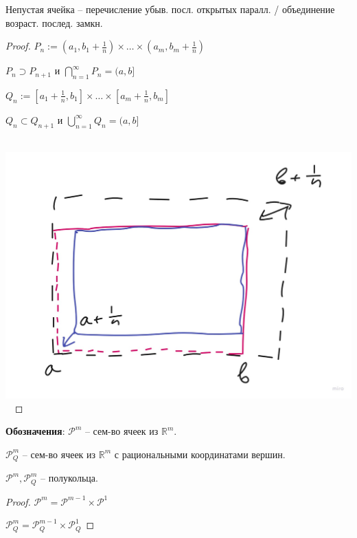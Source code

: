 \begin{theorem}
    Непустая ячейка -- перечисление убыв. посл. открытых паралл. / объединение возраст. послед. замкн.
\end{theorem}

\begin{proof}

    $P_n := (a_1, b_1 + \frac{1}{n}) \times \dots \times (a_m, b_m + \frac{1}{n})$

    $P_n \supset P_{n+1}$ и $\bigcap_{n=1}^{\infty}P_n = (a, b]$

    $Q_n := [a_1 + \frac{1}{n}, b_1] \times \dots \times [a_m + \frac{1}{n}, b_m]$

    $Q_n \subset Q_{n+1}$ и $\bigcup_{n=1}^{\infty}Q_n = (a, b]$ 

    \hbox{
        \includegraphics[scale=0.15]{./assets/01-measure-theory/rects-1.jpg}
    }

\end{proof}

\textbf{Обозначения}: $\mathcal{P}^m$ -- сем-во ячеек из $\mathbb{R}^m$.

$\mathcal{P}_{Q}^{m}$ -- сем-во ячеек из $\mathbb{R}^m$ с рациональными координатами вершин.

\begin{theorem}
    $\mathcal{P}^m, \mathcal{P}^m_Q$ -- полукольца.
\end{theorem}
\begin{proof}
    $\mathcal{P}^m = \mathcal{P}^{m-1} \times \mathcal{P}^1$

    $\mathcal{P}_Q^m = \mathcal{P}_Q^{m-1} \times \mathcal{P}_Q^1$
\end{proof}

